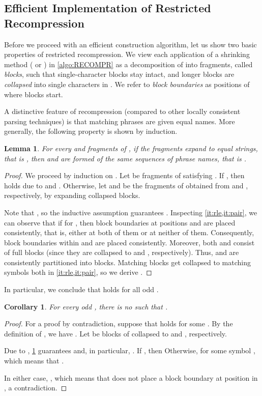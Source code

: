 \documentclass[a4paper]{article}
\newtheorem{lemma}[theorem]{Lemma}
\newtheorem{corollary}[theorem]{Corollary}
\theoremstyle{definition}
\theoremstyle{remark}
\begin{document}
\subsection{Efficient Implementation of Restricted Recompression}
Before we proceed with an efficient construction algorithm, let us show two basic properties of restricted recompression.
We view each application of a shrinking method ( or ) in \cref{algo:RECOMPR} as a decomposition of  into fragments, called \emph{blocks},
such that single-character blocks stay intact, and longer blocks are \emph{collapsed} into single characters in .
We refer to \emph{block boundaries} as positions of  where blocks start.

A distinctive feature of recompression (compared to other locally consistent parsing techniques)
is that matching phrases are given equal names.
More generally, the following property is shown by induction.

\begin{lemma}\label{fct:cons}
For every  and fragments  of , if the fragments expand to equal strings, that is ,
then  and  are formed of the same sequences of phrase names, that is .
\end{lemma} 
\begin{proof}
We proceed by induction on . 
Let  be fragments of  satisfying .
If , then  holds due to  and .
Otherwise, let  and  be the fragments of  obtained from  and , respectively, by expanding collapsed blocks.

Note that , so the inductive assumption guarantees .
Inspecting \cref{it:rle,it:pair}, we can observe that if  for ,
then block boundaries at positions  and  are placed consistently, that is,
either at both of them or at neither of them.
Consequently, block boundaries within  and  are placed consistently.
Moreover, both  and  consist of full blocks (since they are collapsed to  and , respectively). Thus,  and  are consistently partitioned into blocks. 
Matching blocks get collapsed to matching symbols both in \cref{it:rle,it:pair}, so we derive .
\end{proof}

In particular, we conclude that  holds for all odd .
\begin{corollary}\label{cor:distinct}
  For every odd , there is no  such that .
  \end{corollary}
  \begin{proof}
    For a proof by contradiction, suppose that  holds for some .
    By the definition of , we have .
  Let  be 
blocks of  collapsed to  and , respectively. 

Due to , \cref{fct:cons} guarantees  and, in particular, .
    If , then 
Otherwise,  for some symbol ,
    which means that .

In either case, , which means that  does not place a block
    boundary at position  in , a contradiction.
  \end{proof}
\end{document}
